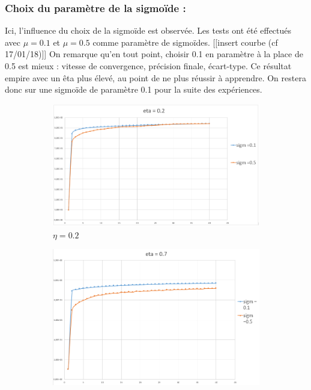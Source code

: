 \subsubsection*{Choix du paramètre de la sigmoïde :}
Ici, l’influence du choix de la sigmoïde est observée. Les tests ont été effectués avec $\mu = 0.1$ et $\mu = 0.5$ comme paramètre de sigmoïdes.
[[insert courbe (cf 17/01/18)]]
On remarque qu’en tout point, choisir 0.1 en paramètre à la place de 0.5 est mieux : vitesse de convergence, précision finale, écart-type. Ce résultat empire avec un êta plus élevé, au point de ne plus réussir à apprendre. On restera donc sur une sigmoïde de paramètre 0.1 pour la suite des expériences.

\begin{figure}[ht!]
  \centering
  \begin{subfigure}[b]{.5\linewidth}
    \includegraphics[width=\linewidth]{fig/MNIST_inflsigm_eta02.png}
    \caption{$\eta=0.2$}
  \end{subfigure}
  \quad
  \begin{subfigure}[b]{.5\linewidth}
    \includegraphics[width=\linewidth]{fig/MNIST_inflsigm_eta07.png}

\end{subfigure}
\end{figure}
